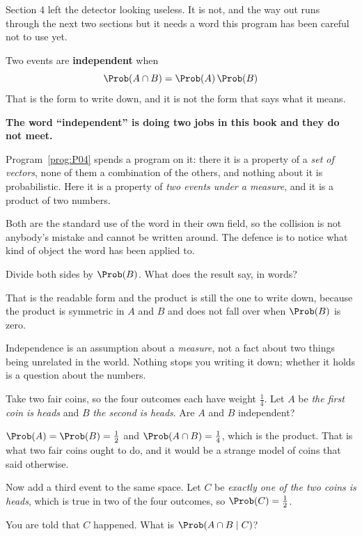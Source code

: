 \begin{fr}
Section 4 left the detector looking useless. It is not, and the way out runs
through the next two sections \dash{} but it needs a word this program has been
careful not to use yet.

Two events are \textbf{independent} when
\[ \Prob(A \cap B) = \Prob(A)\,\Prob(B) \]
That is the form to write down, and it is not the form that says what it means.

\begin{notationbox}
\textbf{The word \enquote{independent} is doing two jobs in this book and they
do not meet.}

Program~\ref{prog:P04} spends a program on it: there it is a property of a
\emph{set of vectors}, none of them a combination of the others, and nothing
about it is probabilistic. Here it is a property of \emph{two events under a
measure}, and it is a product of two numbers.

Both are the standard use of the word in their own field, so the collision is
not anybody's mistake and cannot be written around. The defence is to notice
what kind of object the word has been applied to.
\end{notationbox}

Divide both sides by $\Prob(B)$. What does the result say, in words?
\dotline
\nextframe
\end{fr}

\begin{fr}

That is the readable form and the product is still the one to write down,
because the product is symmetric in $A$ and $B$ and does not fall over when
$\Prob(B)$ is zero.

Independence is an assumption about a \emph{measure}, not a fact about two
things being unrelated in the world. Nothing stops you writing it down; whether
it holds is a question about the numbers.

Take two fair coins, so the four outcomes each have weight $\frac{1}{4}$. Let
$A$ be \emph{the first coin is heads} and $B$ \emph{the second is heads}. Are
$A$ and $B$ independent?
\dotline
\nextframe
\end{fr}

\begin{fr}

$\Prob(A) = \Prob(B) = \frac{1}{2}$ and $\Prob(A \cap B) = \frac{1}{4}$, which
is the product. That is what two fair coins ought to do, and it would be a
strange model of coins that said otherwise.

Now add a third event to the same space. Let $C$ be \emph{exactly one of the
two coins is heads}, which is true in two of the four outcomes, so
$\Prob(C) = \frac{1}{2}$.

You are told that $C$ happened. What is $\Prob(A \cap B \mid C)$?
\dotline
\nextframe
\end{fr}

